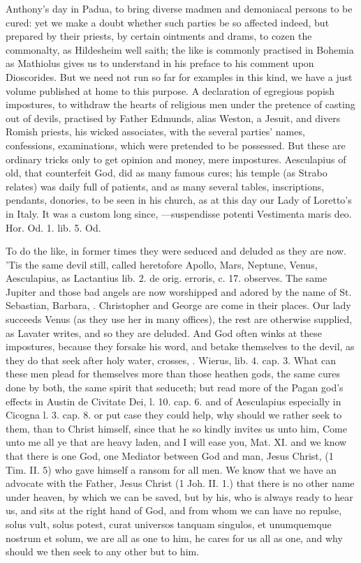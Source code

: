{Anthony's day in Padua, to bring diverse madmen and demoniacal persons
to be cured: yet we make a doubt whether such parties be so affected
indeed, but prepared by their priests, by certain ointments and drams,
to cozen the commonalty, as  Hildesheim well saith; the like is
commonly practised in Bohemia as Mathiolus gives us to understand in
his preface to his comment upon Dioscorides. But we need not run so far
for examples in this kind, we have a just volume published at home to
this purpose. A declaration of egregious popish impostures, to
withdraw the hearts of religious men under the pretence of casting out
of devils, practised by Father Edmunds, alias Weston, a Jesuit, and
divers Romish priests, his wicked associates, with the several parties'
names, confessions, examinations, \etc{} which were pretended to be
possessed. But these are ordinary tricks only to get opinion and money,
mere impostures. Aesculapius of old, that counterfeit God, did as many
famous cures; his temple (as Strabo relates) was daily full of
patients, and as many several tables, inscriptions, pendants, donories,
\etc{} to be seen in his church, as at this day our Lady of Loretto's in
Italy. It was a custom long since,
---suspendisse potenti
Vestimenta maris deo. Hor. Od. 1. lib. 5. Od.

To do the like, in former times they were seduced and deluded as they
are now. 'Tis the same devil still, called heretofore Apollo, Mars,
Neptune, Venus, Aesculapius, \etc{} as Lactantius lib. 2. de orig.
erroris, c. 17. observes. The same Jupiter and those bad angels are now
worshipped and adored by the name of St. Sebastian, Barbara, \etc{}.
Christopher and George are come in their places. Our lady succeeds
Venus (as they use her in many offices), the rest are otherwise
supplied, as Lavater writes, and so they are deluded. And
God often winks at these impostures, because they forsake his word, and
betake themselves to the devil, as they do that seek after holy water,
crosses, \etc{}. Wierus, lib. 4. cap. 3. What can these men plead for
themselves more than those heathen gods, the same cures done by both,
the same spirit that seduceth; but read more of the Pagan god's effects
in Austin de Civitate Dei, l. 10. cap. 6. and of Aesculapius especially
in Cicogna l. 3. cap. 8. or put case they could help, why should we
rather seek to them, than to Christ himself, since that he so kindly
invites us unto him, Come unto me all ye that are heavy laden, and I
will ease you, Mat. XI. and we know that there is one God, one Mediator
between God and man, Jesus Christ, (1 Tim. II. 5) who gave himself a
ransom for all men. We know that we have an  advocate with the
Father, Jesus Christ (1 Joh. II. 1.) that there is no other name under
heaven, by which we can be saved, but by his, who is always ready to
hear us, and sits at the right hand of God, and from  whom we can
have no repulse, solus vult, solus potest, curat universos tanquam
singulos, et unumquemque nostrum et solum, we are all as one to
him, he cares for us all as one, and why should we then seek to any
other but to him.

}
